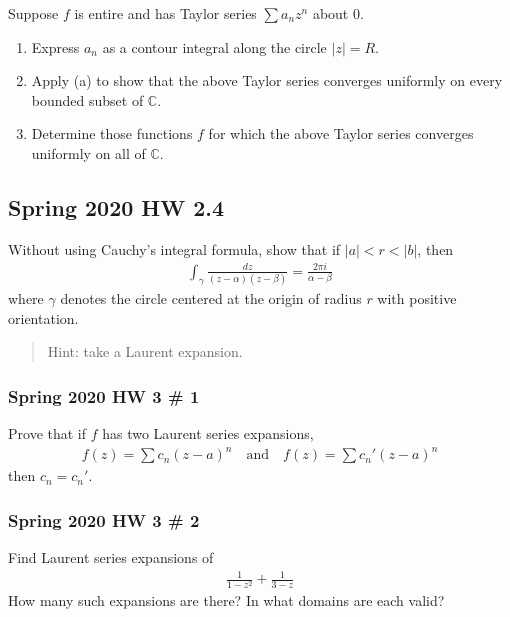 Suppose \(f\) is entire and has Taylor series \(\sum a_n z^n\) about 0.

\begin{enumerate}
\def\labelenumi{\alph{enumi}.}
\item
  Express \(a_n\) as a contour integral along the circle
  \({\left\lvert {z} \right\rvert} = R\).
\item
  Apply (a) to show that the above Taylor series converges uniformly on
  every bounded subset of \({\mathbb{C}}\).
\item
  Determine those functions \(f\) for which the above Taylor series
  converges uniformly on all of \({\mathbb{C}}\).
\end{enumerate}

\hypertarget{spring-2020-hw-2.4}{%
\subsection{Spring 2020 HW 2.4}\label{spring-2020-hw-2.4}}

Without using Cauchy's integral formula, show that if
\({\left\lvert {a} \right\rvert} < r < {\left\lvert {b} \right\rvert}\),
then
\begin{align*}
\int_{\gamma} \frac{d z}{(z-\alpha)(z-\beta)}
=\frac{2 \pi i}{\alpha-\beta}
\end{align*}
where \(\gamma\) denotes the circle centered at the origin of radius
\(r\) with positive orientation.

\begin{quote}
Hint: take a Laurent expansion.
\end{quote}

\hypertarget{spring-2020-hw-3-1}{%
\subsubsection{Spring 2020 HW 3 \# 1}\label{spring-2020-hw-3-1}}

Prove that if \(f\) has two Laurent series expansions,
\begin{align*}
f(z) = \sum c_n(z-a)^n \quad\text{and}\quad f(z) = \sum c_n'(z-a)^n
\end{align*}
then \(c_n = c_n'\).

\hypertarget{spring-2020-hw-3-2}{%
\subsubsection{Spring 2020 HW 3 \# 2}\label{spring-2020-hw-3-2}}

Find Laurent series expansions of
\begin{align*}
\frac{1}{1-z^2} + \frac{1}{3-z}
\end{align*}
How many such expansions are there? In what domains are each valid?

